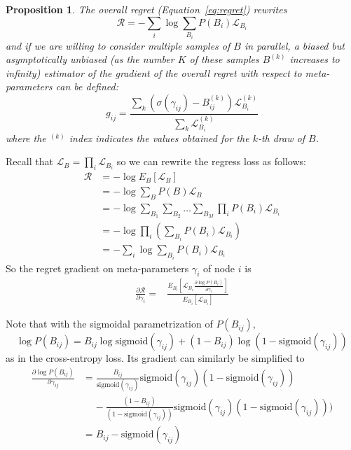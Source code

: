 \documentclass{beamer}
\newcommand{\sigm}{\mathrm{sigmoid}}
\newtheorem{prop}{Proposition}
\begin{document}
\begin{frame}
\begin{prop}
	\label{prop:biased}
	The overall regret (Equation~\eqref{eq:regret}) rewrites
	\begin{equation}
	\mathcal{R} = - \sum_i \log \sum_{B_i} P(B_i) \mathcal{L}_{B_i}
	\end{equation}
	and if we are willing to consider multiple samples of $B$ in parallel, a biased but asymptotically unbiased (as the number $K$ of these samples $B^{(k)}$ increases to infinity) estimator of the gradient of the overall regret with respect to meta-parameters can be defined:
	\begin{equation}
	\label{eq:gij}
	g_{ij} = \frac{\sum_k (\sigma(\gamma_{ij})-B_{ij}^{(k)}) \mathcal{L}_{B_i}^{(k)}}{\sum_k \mathcal{L}_{B_i}^{(k)}}
	\end{equation}
	where the $^{(k)}$ index indicates the values obtained for the $k$-th draw of $B$.
\end{prop}
\end{frame}

\begin{frame}
Recall that $\mathcal{L}_B = \prod_i \mathcal{L}_{B_i}$ so we can rewrite the regress loss as follows:
\begin{align*}
\mathcal{R} &= - \log E_B[ \mathcal{L}_B ] \nonumber \\
&= - \log \sum_B P(B) \mathcal{L}_B \nonumber \\
&= - \log \sum_{B_1} \sum_{B_2} \ldots \sum_{B_M} \prod_i P(B_i) \mathcal{L}_{B_i} \nonumber \\
&= - \log \prod_i \left( \sum_{B_i} P(B_i) \mathcal{L}_{B_i} \right) \nonumber \\
&= - \sum_i \log \sum_{B_i} P(B_i) \mathcal{L}_{B_i}
\end{align*}
So the regret gradient on meta-parameters $\gamma_i$ of node $i$ is
\begin{align*}
\frac{\partial \mathcal{R}}{\partial \gamma_i}=& \frac{E_{B_i}[\mathcal{L}_{B_i} \frac{\partial \log P(B_i)}{\partial \gamma_i}]}{E_{B_i}[\mathcal{L}_{B_i}]}
\end{align*}
\end{frame}

\begin{frame}
Note that with the sigmoidal parametrization of $P(B_{ij})$, 
$$\log P(B_{ij})=B_{ij} \log \sigm(\gamma_{ij}) + (1-B_{ij}) \log (1- \sigm(\gamma_{ij}))$$ 
as in the cross-entropy loss. Its gradient can similarly be simplified to
\begin{align}
\frac{\partial \log P(B_{ij})}{\partial \gamma_{ij}} &=
\frac{B_{ij}}{\sigm(\gamma_{ij})} \sigm(\gamma_{ij})(1-\sigm(\gamma_{ij})) \nonumber \\
&\;\;\;\;- \frac{(1-B_{ij})}{(1-\sigm(\gamma_{ij}))}\sigm(\gamma_{ij})(1-\sigm(\gamma_{ij}))) \nonumber \\
&= B_{ij}-\sigm(\gamma_{ij})
\end{align} 
\end{frame}
\end{document}
